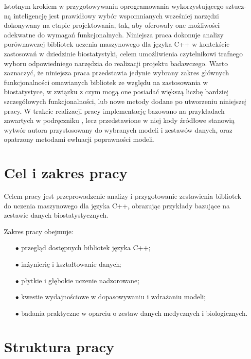 Istotnym krokiem w przygotowywaniu oprogramowania wykorzystującego sztucz-ną inteligencję jest prawidłowy wybór wspomnianych wcześniej narzędzi dokonywany na etapie projektowania, tak, aby oferowały one możliwości adekwatne do wymagań funkcjonalnych. Niniejsza praca dokonuje analizy porównawczej bibliotek uczenia maszynowego dla języka C++ w kontekście zastosowań w dziedzinie biostatystyki, celem umożliwienia czytelnikowi trafnego wyboru odpowiedniego narzędzia do realizacji projektu badawczego. Warto zaznaczyć, że niniejsza praca przedstawia jedynie wybrany zakres głównych funkcjonalności omawianych bibliotek ze względu na zastosowania w biostatystyce, w związku z czym mogą one posiadać większą liczbę bardziej szczegółowych funkcjonalności, lub nowe metody dodane po utworzeniu niniejszej pracy. W trakcie realizacji pracy implementację bazowano na przykładach zawartych w podręczniku \cite{handsOnMachineLearning}, lecz przedstawione w niej kody źródłowe stanowią wytwór autora przystosowany do wybranych modeli i zestawów danych, oraz opatrzony metodami ewluacji poprawności modeli. 

\section{Cel i zakres pracy} %

Celem pracy jest przeprowadzenie analizy i przygotowanie zestawienia bibliotek do uczenia maszynowego dla języka C++, obrazując przykłady bazujące na zestawie danych biostatystycznych.

Zakres pracy obejmuje:

\begin{itemize}
    \item [$\bullet$] przegląd dostępnych bibliotek języka C++;
    \item [$\bullet$] inżynierię i kształtowanie danych;
    \item [$\bullet$] płytkie i głębokie uczenie nadzorowane;
    \item [$\bullet$] kwestie wydajnościowe w dopasowywaniu i wdrażaniu modeli;
    \item [$\bullet$] badania praktyczne w oparciu o zestaw danych medycznych i biologicznych.
\end{itemize}

\section{Struktura pracy} %

